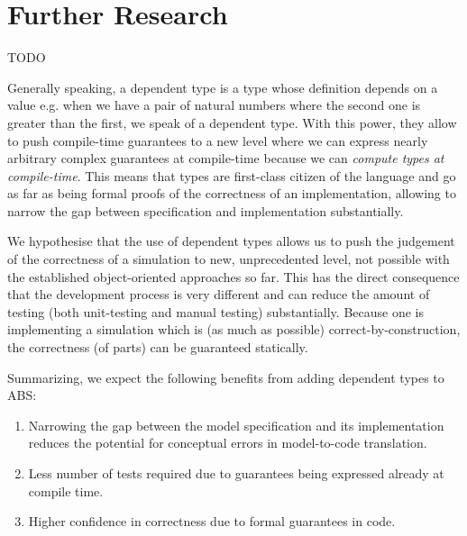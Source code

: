 \section{Further Research}
TODO


Generally speaking, a dependent type is a type whose definition depends on a value e.g. when we have a pair of natural numbers where the second one is greater than the first, we speak of a dependent type. With this power, they allow to push compile-time guarantees to a new level where we can express nearly arbitrary complex guarantees at compile-time because we can \textit{compute types at compile-time}. This means that types are first-class citizen of the language and go as far as being formal proofs of the correctness of an implementation, allowing to narrow the gap between specification and implementation substantially.

We hypothesise that the use of dependent types allows us to push the judgement of the correctness of a simulation to new, unprecedented level, not possible with the established object-oriented approaches so far. This has the direct consequence that the development process is very different and can reduce the amount of testing (both unit-testing and manual testing) substantially. Because one is implementing a simulation which is (as much as possible) correct-by-construction, the correctness (of parts) can be guaranteed statically.


Summarizing, we expect the following benefits from adding dependent types to ABS:

\begin{enumerate}
	\item Narrowing the gap between the model specification and its implementation reduces the potential for conceptual errors in model-to-code translation.
	\item Less number of tests required due to guarantees being expressed already at compile time.
	\item Higher confidence in correctness due to formal guarantees in code.
\end{enumerate}
